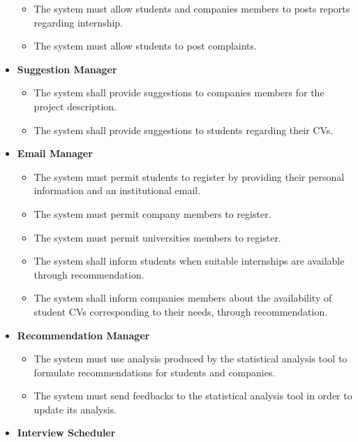 \begin{itemize}
\begin{itemize}
        \item [\text{ [R26] }] The system must allow students and companies members to posts reports regarding internship.
        \item [\text{ [R35] }] The system must allow students to post complaints.\\
    \end{itemize}
    \item \textbf{Suggestion Manager}
    \begin{itemize}
        \item [\text{ [R12] }] The system shall provide suggestions to companies members for the project description.
        \item [\text{ [R13] }] The system shall provide suggestions to students regarding their CVs.\\
    \end{itemize}
    \item \textbf{Email Manager}
    \begin{itemize}
        \item [\text{ [R1] }] The system must permit students to register by providing their personal information and an institutional email.
        \item [\text{ [R2] }] The system must permit company members to register.
        \item [\text{ [R3] }] The system must permit universities members to register.
        \item [\text{ [R9] }] The system shall inform students when suitable internships are available through recommendation.
        \item [\text{ [R10] }] The system shall inform companies members about the availability of student CVs corresponding to their needs, through recommendation.\\
    \end{itemize}
    \item \textbf{Recommendation Manager}
    \begin{itemize}
        \item [\text{ [R11] }] The system must use analysis produced by the statistical analysis tool to formulate recommendations for students and companies.
        \item [\text{ [R16] }] The system must send feedbacks to the statistical analysis tool in order to update its analysis.\\
    \end{itemize}
    \item \textbf{Interview Scheduler}

\end{itemize}
